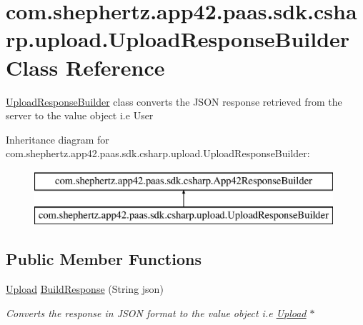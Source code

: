 \hypertarget{classcom_1_1shephertz_1_1app42_1_1paas_1_1sdk_1_1csharp_1_1upload_1_1_upload_response_builder}{\section{com.\+shephertz.\+app42.\+paas.\+sdk.\+csharp.\+upload.\+Upload\+Response\+Builder Class Reference}
\label{classcom_1_1shephertz_1_1app42_1_1paas_1_1sdk_1_1csharp_1_1upload_1_1_upload_response_builder}
}


\hyperlink{classcom_1_1shephertz_1_1app42_1_1paas_1_1sdk_1_1csharp_1_1upload_1_1_upload_response_builder}{Upload\+Response\+Builder} class converts the J\+S\+O\+N response retrieved from the server to the value object i.\+e User  


Inheritance diagram for com.\+shephertz.\+app42.\+paas.\+sdk.\+csharp.\+upload.\+Upload\+Response\+Builder\+:\begin{figure}[H]
\begin{center}
\leavevmode
\includegraphics[height=2.000000cm]{classcom_1_1shephertz_1_1app42_1_1paas_1_1sdk_1_1csharp_1_1upload_1_1_upload_response_builder}
\end{center}
\end{figure}
\subsection*{Public Member Functions}
\begin{DoxyCompactItemize}
\item 
\hyperlink{classcom_1_1shephertz_1_1app42_1_1paas_1_1sdk_1_1csharp_1_1upload_1_1_upload}{Upload} \hyperlink{classcom_1_1shephertz_1_1app42_1_1paas_1_1sdk_1_1csharp_1_1upload_1_1_upload_response_builder_a4b9d0c2c03eb941f9cdc03b60f7cffc1}{Build\+Response} (String json)
\begin{DoxyCompactList}\small\item\em Converts the response in J\+S\+O\+N format to the value object i.\+e \hyperlink{classcom_1_1shephertz_1_1app42_1_1paas_1_1sdk_1_1csharp_1_1upload_1_1_upload}{Upload} $\ast$ \end{DoxyCompactList}\end{DoxyCompactItemize}



